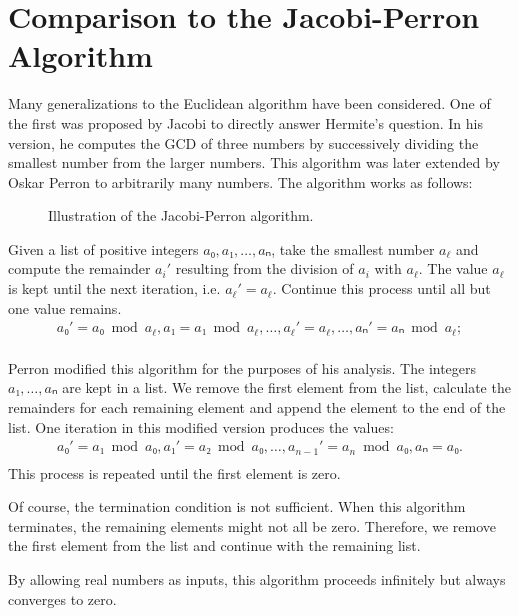 \section{Comparison to the Jacobi-Perron Algorithm}

Many generalizations to the Euclidean algorithm have been considered.
One of the first was proposed by Jacobi to directly answer Hermite's question.
In his version, he computes the GCD of three numbers by successively dividing
the smallest number from the larger numbers.
This algorithm was later extended by Oskar Perron to arbitrarily many numbers.
The algorithm works as follows:

\begin{figure}[tbp]
  \centering
  
  \caption{
    Illustration of the Jacobi-Perron algorithm.
  }
\end{figure}

Given a list of positive integers $a₀, a₁, …, aₙ$, take the smallest number $a_ℓ$
and compute the remainder $a_i'$ resulting from the division of $a_i$ with $a_ℓ$.
The value $a_ℓ$ is kept until the next iteration, i.e. $a_ℓ' = a_ℓ$.
Continue this process until all but one value remains.
\begin{align*}
  a₀' = a₀ \bmod a_ℓ, a₁ = a₁ \bmod a_ℓ, …, a_ℓ' = a_ℓ, …, aₙ' = aₙ \bmod a_ℓ; \\
\end{align*}

Perron modified this algorithm for the purposes of his analysis.
The integers $a₁, …, aₙ$ are kept in a list.
We remove the first element from the list, calculate the remainders for each
remaining element and append the element to the end of the list.
One iteration in this modified version produces the values:
\begin{align*}
  a₀' = a₁ \bmod a₀, a₁' = a₂ \bmod a₀, …, a_{n-1}' = a_n \bmod a₀, aₙ = a₀. \\
\end{align*}
This process is repeated until the first element is zero.

Of course, the termination condition is not sufficient.
When this algorithm terminates, the remaining elements might not all be zero.
Therefore, we remove the first element from the list and continue with the
remaining list.

By allowing real numbers as inputs, this algorithm proceeds infinitely but
always converges to zero.

